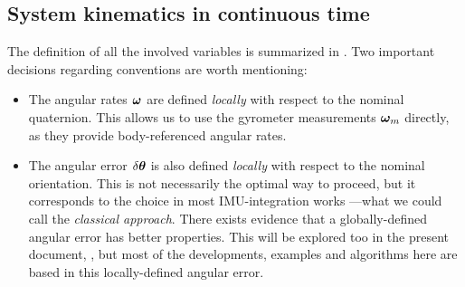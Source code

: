 \subsection{System kinematics in continuous time}

The definition of all the involved variables is summarized in . 
Two important decisions regarding conventions are worth mentioning:
\begin{itemize}
\item
The angular rates ${\bm \omega}$ are defined \emph{locally} with respect to the nominal quaternion. 
This allows us to use the gyrometer measurements ${\bm \omega}_m$ directly, as they provide body-referenced angular rates.
\item
The angular error $\delta{\bm \theta}$ is also defined \emph{locally} with respect to the nominal orientation. 
This is not necessarily the optimal way to proceed, but it corresponds to the choice in most IMU-integration works ---what we could call the \emph{classical approach}. 
There exists evidence \citep{LI-2012} that a globally-defined angular error has better properties. 
This will be explored too in the present document, , but most of the developments, examples and algorithms here are based in this locally-defined angular error.
\end{itemize}

